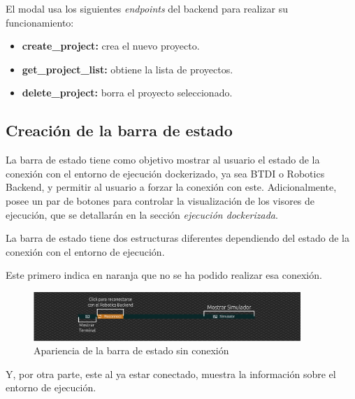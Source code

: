 
El modal usa los siguientes \textit{endpoints} del backend para realizar su funcionamiento:

\begin{itemize}
    \item \textbf{create\_project:} crea el nuevo proyecto.
    \item \textbf{get\_project\_list:} obtiene la lista de proyectos.
    \item \textbf{delete\_project:} borra el proyecto seleccionado.
\end{itemize} 

\subsection{Creación de la barra de estado}

La barra de estado tiene como objetivo mostrar al usuario el estado de la conexión con el entorno de ejecución dockerizado, ya sea BTDI o Robotics Backend, y permitir al usuario a forzar la conexión con este. Adicionalmente, posee un par de botones para controlar la visualización de los visores de ejecución, que se detallarán en la sección \textit{ejecución dockerizada}.

La barra de estado tiene dos estructuras diferentes dependiendo del estado de la conexión con el entorno de ejecución.

Este primero indica en naranja que no se ha podido realizar esa conexión.

\begin{figure}[H]
    \centering
    \includegraphics[width=0.9\textwidth]{figures/bt-avances/status-bar-rec.png}
    \caption{Apariencia de la barra de estado sin conexión}
    \label{fig:status-bar-rec}
\end{figure}

Y, por otra parte, este al ya estar conectado, muestra la información sobre el entorno de ejecución.

